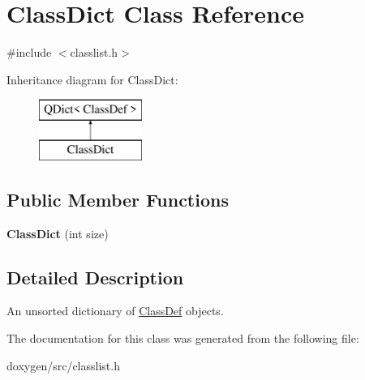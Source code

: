 \hypertarget{class_class_dict}{}\section{Class\+Dict Class Reference}
\label{class_class_dict}


{\ttfamily \#include $<$classlist.\+h$>$}

Inheritance diagram for Class\+Dict\+:\begin{figure}[H]
\begin{center}
\leavevmode
\includegraphics[height=2.000000cm]{class_class_dict}
\end{center}
\end{figure}
\subsection*{Public Member Functions}
\begin{DoxyCompactItemize}
\item 
\mbox{\label{class_class_dict_a870551e52e630e81bda6741643ec4775}} 
{\bfseries Class\+Dict} (int size)
\end{DoxyCompactItemize}


\subsection{Detailed Description}
An unsorted dictionary of \mbox{\hyperlink{class_class_def}{Class\+Def}} objects. 

The documentation for this class was generated from the following file\+:\begin{DoxyCompactItemize}
\item 
doxygen/src/classlist.\+h\end{DoxyCompactItemize}

